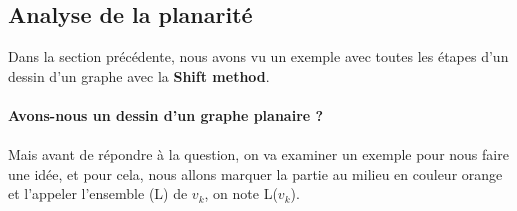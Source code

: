 \documentclass[hidelinks,letterpaper,12pt]{article}
\begin{document}
\subsection{Analyse de la planarité}
Dans la section précédente, nous avons vu un exemple avec toutes les étapes d'un dessin d'un graphe avec la \textbf{Shift method}. 
\\ \\
\textbf{Avons-nous un dessin d'un graphe planaire ? }
\\ \\
Mais avant de répondre à la question, on va examiner un exemple pour nous faire une idée, et pour cela, nous allons marquer la partie au milieu en couleur orange et l'appeler l'ensemble (L) de $v_k$,  on note L($v_k$).
\end{document}
